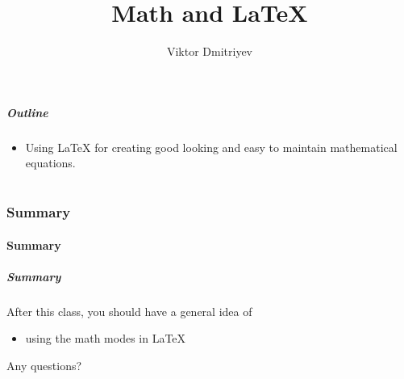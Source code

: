 \documentclass[slidestop,compress,mathserif]{beamer}
\title{Math and LaTeX}
\subtitle{}
\author{Viktor Dmitriyev}
\institute{Adapter from Mini Course on LaTeX by \href{https://github.com/OpenIntroOrg/mini-course-materials}{David Diez}}
\date{}
\begin{document}
\newenvironment{act}[1]{{\color{command}#1}}{}
\newcommand{\lcom}[1]{{\color{command}$\backslash$#1}}
\newcommand{\larg}[1]{{\color{braces}$\{${\color{black}#1}$\}$}}
\newcommand{\mathText}[1]{{\color{braces}\${\color{black}#1}\$}}


\frame{ \titlepage }

\begin{frame}
  \frametitle{Outline}
  \begin{itemize}
	  \item Using LaTeX for creating good looking and easy to maintain mathematical equations. 
  \end{itemize}
\end{frame}

\part{}



\section[Summary]{Summary}
\subsection[Summary]{Summary}

\begin{frame}  \frametitle{Summary}
After this class, you should have a general idea of
	\vspace{1mm} \\
		\begin{itemize}
			\item using the math modes in LaTeX
		\end{itemize}
	\vspace{1mm}

Any questions?
\end{frame}
\end{document}
